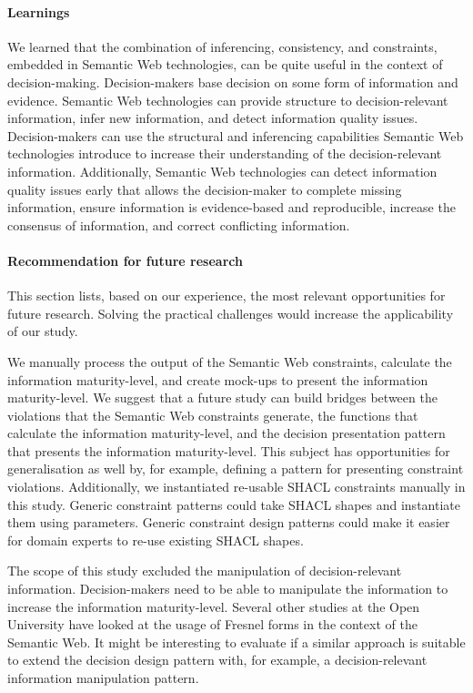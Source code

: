 \paragraph{Learnings}
We learned that the combination of inferencing, consistency, and constraints, embedded in Semantic Web technologies, can be quite useful in the context of decision-making. Decision-makers base decision on some form of information and evidence. Semantic Web technologies can provide structure to decision-relevant information, infer new information, and detect information quality issues. Decision-makers can use the structural and inferencing capabilities Semantic Web technologies introduce to increase their understanding of the decision-relevant information. Additionally, Semantic Web technologies can detect information quality issues early that allows the decision-maker to complete missing information, ensure information is evidence-based and reproducible, increase the consensus of information, and correct conflicting information.

\paragraph{Recommendation for future research}
This section lists, based on our experience, the most relevant opportunities for future research. Solving the practical challenges would increase the applicability of our study.

We manually process the output of the Semantic Web constraints, calculate the information maturity-level, and create mock-ups to present the information maturity-level. We suggest that a future study can build bridges between the violations that the Semantic Web constraints generate, the functions that calculate the information maturity-level, and the decision presentation pattern that presents the information maturity-level. This subject has opportunities for generalisation as well by, for example, defining a pattern for presenting constraint violations. Additionally, we instantiated re-usable SHACL constraints manually in this study. Generic constraint patterns could take SHACL shapes and instantiate them using parameters. Generic constraint design patterns could make it easier for domain experts to re-use existing SHACL shapes.

The scope of this study excluded the manipulation of decision-relevant information. Decision-makers need to be able to manipulate the information to increase the information maturity-level. Several other studies at the Open University have looked at the usage of Fresnel forms in the context of the Semantic Web. It might be interesting to evaluate if a similar approach is suitable to extend the decision design pattern with, for example, a decision-relevant information manipulation pattern.

